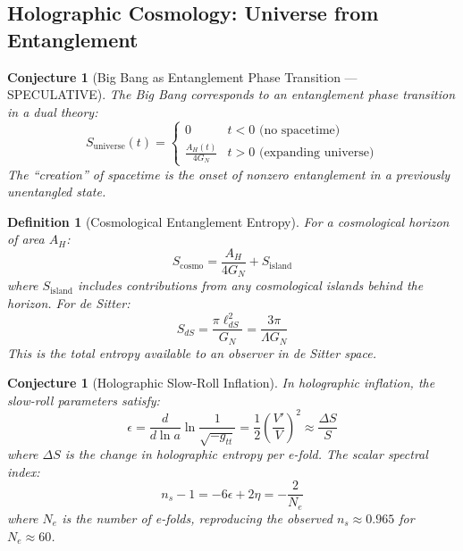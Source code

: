 \documentclass[12pt,a4paper]{article}
\newtheorem{conjecture}[theorem]{Conjecture}
\newtheorem{definition}[theorem]{Definition}
\begin{document}
\subsection{Holographic Cosmology: Universe from Entanglement}

\begin{conjecture}[Big Bang as Entanglement Phase Transition --- SPECULATIVE]
The Big Bang corresponds to an entanglement phase transition in a dual theory:
\begin{equation}
S_{\text{universe}}(t) = \begin{cases}
0 & t < 0 \text{ (no spacetime)} \\
\frac{A_H(t)}{4G_N} & t > 0 \text{ (expanding universe)}
\end{cases}
\end{equation}
The ``creation'' of spacetime is the onset of nonzero entanglement in a previously unentangled state.
\end{conjecture}

\begin{definition}[Cosmological Entanglement Entropy]
For a cosmological horizon of area $A_H$:
\begin{equation}
S_{\text{cosmo}} = \frac{A_H}{4G_N} + S_{\text{island}}
\end{equation}
where $S_{\text{island}}$ includes contributions from any cosmological islands behind the horizon. For de Sitter:
\begin{equation}
S_{dS} = \frac{\pi \ell_{dS}^2}{G_N} = \frac{3\pi}{\Lambda G_N}
\end{equation}
This is the total entropy available to an observer in de Sitter space.
\end{definition}

\begin{conjecture}[Holographic Slow-Roll Inflation]
In holographic inflation, the slow-roll parameters satisfy:
\begin{equation}
\epsilon = \frac{d}{d \ln a} \ln \frac{1}{\sqrt{-g_{tt}}} = \frac{1}{2} \left( \frac{V'}{V} \right)^2 \approx \frac{\Delta S}{S}
\end{equation}
where $\Delta S$ is the change in holographic entropy per e-fold. The scalar spectral index:
\begin{equation}
n_s - 1 = -6\epsilon + 2\eta = -\frac{2}{N_e}
\end{equation}
where $N_e$ is the number of e-folds, reproducing the observed $n_s \approx 0.965$ for $N_e \approx 60$.
\end{conjecture}
\end{document}
